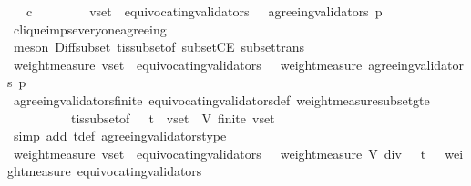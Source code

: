 \begin{isabellebody}
\ \ \ {\isachardoublequoteopen}c\ {\isasymin}\ {\isasymepsilon}\ {\isasymsigma}{\isachardoublequoteclose}\isanewline
\ \ \isamarkupfalse%
\ \isamarkupfalse%
\ {\isachardoublequoteopen}v{\isacharunderscore}set\ {\isacharminus}\ equivocating{\isacharunderscore}validators\ {\isasymsigma}\ {\isasymsubseteq}\ agreeing{\isacharunderscore}validators\ {\isacharparenleft}p{\isacharcomma}\ {\isasymsigma}{\isacharparenright}{\isachardoublequoteclose}\ \isanewline
\ \ \ \ \isamarkupfalse%
\ clique{\isacharunderscore}imps{\isacharunderscore}everyone{\isacharunderscore}agreeing\isanewline
\ \ \ \ \isamarkupfalse%
\ {\isacharparenleft}meson\ Diff{\isacharunderscore}subset\ {\isasymSigma}t{\isacharunderscore}is{\isacharunderscore}subset{\isacharunderscore}of{\isacharunderscore}{\isasymSigma}\ subsetCE\ subset{\isacharunderscore}trans{\isacharparenright}\isanewline
\ \ \isamarkupfalse%
\ \isamarkupfalse%
\ {\isachardoublequoteopen}weight{\isacharunderscore}measure\ {\isacharparenleft}v{\isacharunderscore}set\ {\isacharminus}\ equivocating{\isacharunderscore}validators\ {\isasymsigma}{\isacharparenright}\ {\isasymle}\ weight{\isacharunderscore}measure\ {\isacharparenleft}agreeing{\isacharunderscore}validators\ {\isacharparenleft}p{\isacharcomma}\ {\isasymsigma}{\isacharparenright}{\isacharparenright}{\isachardoublequoteclose}\isanewline
\ \ \ \ \isamarkupfalse%
\ agreeing{\isacharunderscore}validators{\isacharunderscore}finite\ equivocating{\isacharunderscore}validators{\isacharunderscore}def\ weight{\isacharunderscore}measure{\isacharunderscore}subset{\isacharunderscore}gte\isanewline
\ \ \ \ \ \ \ \ \ \ {\isasymSigma}t{\isacharunderscore}is{\isacharunderscore}subset{\isacharunderscore}of{\isacharunderscore}{\isasymSigma}\ {\isacartoucheopen}{\isasymsigma}\ {\isasymin}\ {\isasymSigma}t\ {\isasymand}\ v{\isacharunderscore}set\ {\isasymsubseteq}\ V{\isacartoucheclose}\ {\isacartoucheopen}finite\ v{\isacharunderscore}set{\isacartoucheclose}\isanewline
\ \ \ \ \isamarkupfalse%
\ {\isacharparenleft}simp\ add{\isacharcolon}\ {\isasymSigma}t{\isacharunderscore}def\ agreeing{\isacharunderscore}validators{\isacharunderscore}type{\isacharparenright}\isanewline
\ \ \isamarkupfalse%
\ {\isachardoublequoteopen}weight{\isacharunderscore}measure\ {\isacharparenleft}v{\isacharunderscore}set\ {\isacharminus}\ equivocating{\isacharunderscore}validators\ {\isasymsigma}{\isacharparenright}\ {\isachargreater}\ {\isacharparenleft}weight{\isacharunderscore}measure\ V{\isacharparenright}\ div\ {}\ {\isacharplus}\ t\ \ {\isacharminus}\ weight{\isacharunderscore}measure\ {\isacharparenleft}equivocating{\isacharunderscore}validators\ {\isasymsigma}{\isacharparenright}{\isachardoublequoteclose}\isanewline

\end{isabellebody}
